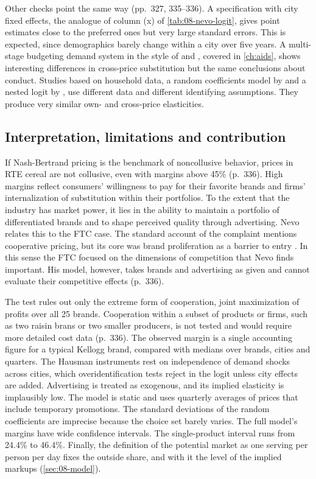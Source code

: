 Other checks point the same way (pp.~327, 335--336). A specification with city fixed effects, the analogue of
column (x) of \cref{tab:08-nevo-logit}, gives point estimates close to the preferred ones but very large
standard errors. This is expected, since demographics barely change within a city over five years. A
multi-stage budgeting demand system in the style of \citet{HausmanLeonardZona1994} and \citet{Hausman1997},
covered in \cref{ch:aids}, shows interesting differences in cross-price substitution but the same conclusions
about conduct. Studies based on household data, a random coefficients model by \citet{Kiser1996} and a nested
logit by \citet{Shum1999}, use different data and different identifying assumptions. They produce very similar
own- and cross-price elasticities.

\subsection{Interpretation, limitations and contribution}\label{sec:08-nevo01-assess}

 If Nash-Bertrand pricing is the benchmark of noncollusive behavior, prices in RTE
cereal are not collusive, even with margins above 45\% (p.~336). High margins reflect consumers' willingness
to pay for their favorite brands and firms' internalization of substitution within their portfolios. To the
extent that the industry has market power, it lies in the ability to maintain a portfolio of differentiated
brands and to shape perceived quality through advertising. Nevo relates this to the FTC case. The standard
account of the complaint mentions cooperative pricing, but its core was brand proliferation as a barrier to
entry \citep{Schmalensee1978}. In this sense the FTC focused on the dimensions of competition that Nevo finds
important. His model, however, takes brands and advertising as given and cannot evaluate their competitive
effects (p.~336).

 The test rules out only the extreme form of cooperation, joint maximization of profits
over all 25 brands. Cooperation within a subset of products or firms, such as two raisin brans or two smaller
producers, is not tested and would require more detailed cost data (p.~336). The observed margin is a single
accounting figure for a typical Kellogg brand, compared with medians over brands, cities and quarters. The
Hausman instruments rest on independence of demand shocks across cities, which overidentification tests reject
in the logit unless city effects are added. Advertising is treated as exogenous, and its implied elasticity is
implausibly low. The model is static and uses quarterly averages of prices that include temporary promotions.
The standard deviations of the random coefficients are imprecise because the choice set barely varies. The
full model's margins have wide confidence intervals. The single-product interval runs from 24.4\% to 46.4\%.
Finally, the definition of the potential market as one serving per person per day fixes the outside share,
and with it the level of the implied markups (\cref{sec:08-model}).

